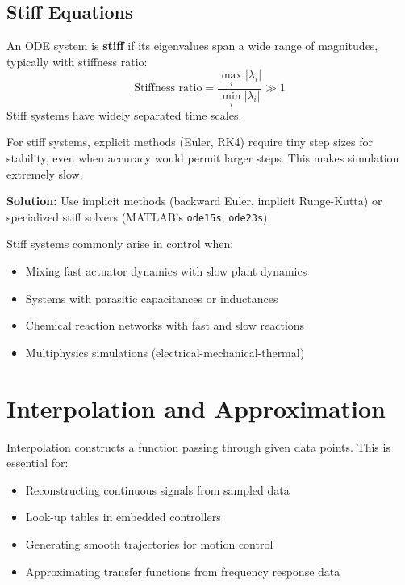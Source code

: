 \subsection{Stiff Equations}

\begin{definitionbox}[title=Definition 11.14: Stiff ODEs]
An ODE system is \textbf{stiff} if its eigenvalues span a wide range of magnitudes, typically with stiffness ratio:
\begin{equation}
\text{Stiffness ratio} = \frac{\max_i |\lambda_i|}{\min_i |\lambda_i|} \gg 1
\end{equation}
Stiff systems have widely separated time scales.
\end{definitionbox}

\begin{warningbox}[title=The Stiffness Problem]
For stiff systems, explicit methods (Euler, RK4) require tiny step sizes for stability, even when accuracy would permit larger steps. This makes simulation extremely slow.

\textbf{Solution:} Use implicit methods (backward Euler, implicit Runge-Kutta) or specialized stiff solvers (MATLAB's \texttt{ode15s}, \texttt{ode23s}).
\end{warningbox}

Stiff systems commonly arise in control when:
\begin{itemize}
    \item Mixing fast actuator dynamics with slow plant dynamics
    \item Systems with parasitic capacitances or inductances
    \item Chemical reaction networks with fast and slow reactions
    \item Multiphysics simulations (electrical-mechanical-thermal)
\end{itemize}

\section{Interpolation and Approximation}
\label{sec:interpolation}

Interpolation constructs a function passing through given data points. This is essential for:
\begin{itemize}
    \item Reconstructing continuous signals from sampled data
    \item Look-up tables in embedded controllers
    \item Generating smooth trajectories for motion control
    \item Approximating transfer functions from frequency response data
\end{itemize}

